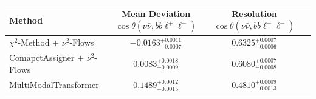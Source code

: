     \begin{tabular}{lccc}
        \toprule
        Method & Mean Deviation $\cos\theta(\nu\bar{\nu}, b\bar{b}\ell^+\ell^-)$ & Resolution $\cos\theta(\nu\bar{\nu}, b\bar{b}\ell^+\ell^-)$ \\
        \midrule
        $\chi^2$-Method + $\nu^2$-Flows & $-0.0163^{+0.0011}_{-0.0007}$ & $0.6325^{+0.0007}_{-0.0006}$ \\
        ComapctAssigner + $\nu^2$-Flows & $0.0083^{+0.0018}_{-0.0009}$ & $0.6080^{+0.0007}_{-0.0008}$ \\
        MultiModalTransformer & $0.1489^{+0.0012}_{-0.0015}$ & $0.4810^{+0.0009}_{-0.0013}$ \\
        \bottomrule
    \end{tabular}